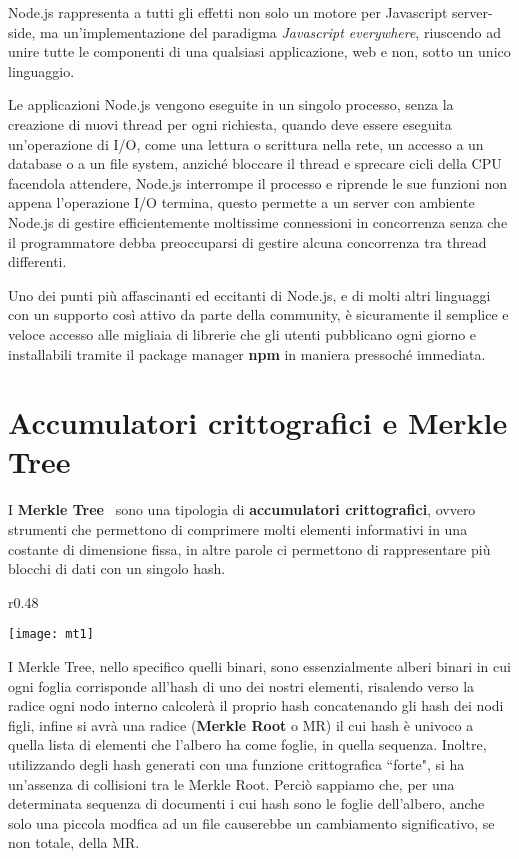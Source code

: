 Node.js rappresenta a tutti gli effetti non solo un motore per Javascript server-side,
ma un'implementazione del paradigma \emph{Javascript everywhere}, riuscendo ad unire
tutte le componenti di una qualsiasi applicazione, web e non, sotto un unico linguaggio.

Le applicazioni Node.js vengono eseguite in un singolo processo, senza la creazione di
nuovi thread per ogni richiesta, quando deve essere eseguita un'operazione di I/O,
come una lettura o scrittura nella rete, un accesso a un database o a un file system,
anziché bloccare il thread e sprecare cicli della CPU facendola attendere, Node.js
interrompe il processo e riprende le sue funzioni non appena l'operazione I/O termina,
questo permette a un server con ambiente Node.js di gestire efficientemente moltissime
connessioni in concorrenza senza che il programmatore debba preoccuparsi di gestire
alcuna concorrenza tra thread differenti.

Uno dei punti più affascinanti ed eccitanti di Node.js, e di molti altri linguaggi
con un supporto così attivo da parte della community, è sicuramente il semplice e
veloce accesso alle migliaia di librerie che gli utenti pubblicano ogni giorno e
installabili tramite il package manager \textbf{npm} in maniera pressoché immediata.

\newpage

\section{Accumulatori crittografici e Merkle Tree}
\label{sub:mt}
I \textbf{Merkle Tree}~\cite{mertree} sono una tipologia di \textbf{accumulatori crittografici}, ovvero strumenti che permettono
di comprimere molti elementi informativi in una costante di dimensione fissa, in altre parole
ci permettono di rappresentare più blocchi di dati con un singolo hash.
\begin{wrapfigure}{r}{0.48\textwidth}
    \vspace{-20pt}
    \begin{center}
      \texttt{[image: mt1]}
    \end{center}
    \vspace{-20pt}
\end{wrapfigure}
I Merkle Tree, nello specifico quelli binari, sono essenzialmente alberi binari
in cui ogni foglia corrisponde all'hash di uno dei nostri elementi, risalendo verso la radice ogni
nodo interno calcolerà il proprio hash concatenando gli hash dei nodi figli, infine si avrà
una radice (\textbf{Merkle Root} o MR) il cui hash è univoco a quella lista di elementi che l'albero
ha come foglie, in quella sequenza.
Inoltre, utilizzando degli hash generati con una funzione crittografica ``forte", si ha
un'assenza di collisioni tra le Merkle Root.
Perciò sappiamo che, per una determinata sequenza di documenti i cui hash sono le foglie dell'albero, anche solo una
piccola modfica ad un file causerebbe un cambiamento significativo, se non totale, della MR.

